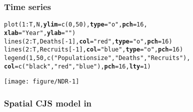 \documentclass[color=usenames,dvipsnames]{beamer}\usepackage[]{graphicx}\usepackage[]{color}
\makeatletter
\newcommand{\hlnum}[1]{\textcolor[rgb]{0.69,0.494,0}{#1}}%
\newcommand{\hlstr}[1]{\textcolor[rgb]{0.749,0.012,0.012}{#1}}%
\newcommand{\hlopt}[1]{\textcolor[rgb]{0,0,0}{#1}}%
\newcommand{\hlstd}[1]{\textcolor[rgb]{0,0,0}{#1}}%
\newcommand{\hlkwc}[1]{\textcolor[rgb]{0,0,0}{\textbf{#1}}}%
\newcommand{\hlkwd}[1]{\textcolor[rgb]{0.004,0.004,0.506}{#1}}%
\newenvironment{kframe}{%
 \def\at@end@of@kframe{}%
 \ifinner\ifhmode%
  \def\at@end@of@kframe{\end{minipage}}%
  \begin{minipage}{\columnwidth}%
 \fi\fi%
 \def\FrameCommand##1{\hskip\@totalleftmargin \hskip-\fboxsep
 \colorbox{shadecolor}{##1}\hskip-\fboxsep
     \hskip-\linewidth \hskip-\@totalleftmargin \hskip\columnwidth}%
 \MakeFramed {\advance\hsize-\width
   \@totalleftmargin\z@ \linewidth\hsize
   \@setminipage}}%
 {\par\unskip\endMakeFramed%
 \at@end@of@kframe}
\newenvironment{knitrout}{}{} %
\makeatother
\begin{document}
\begin{frame}[fragile]
  \frametitle{Time series}
\begin{knitrout}\tiny
{}\color{fgcolor}\begin{kframe}
\begin{alltt}
\hlkwd{plot}\hlstd{(}\hlnum{1}\hlopt{:}\hlstd{T, N,} \hlkwc{ylim}\hlstd{=}\hlkwd{c}\hlstd{(}\hlnum{0}\hlstd{,} \hlnum{50}\hlstd{),} \hlkwc{type}\hlstd{=}\hlstr{"o"}\hlstd{,} \hlkwc{pch}\hlstd{=}\hlnum{16}\hlstd{,}
     \hlkwc{xlab}\hlstd{=}\hlstr{"Year"}\hlstd{,} \hlkwc{ylab}\hlstd{=}\hlstr{""}\hlstd{)}
\hlkwd{lines}\hlstd{(}\hlnum{2}\hlopt{:}\hlstd{T, Deaths[}\hlopt{-}\hlnum{1}\hlstd{],} \hlkwc{col}\hlstd{=}\hlstr{"red"}\hlstd{,} \hlkwc{type}\hlstd{=}\hlstr{"o"}\hlstd{,} \hlkwc{pch}\hlstd{=}\hlnum{16}\hlstd{)}
\hlkwd{lines}\hlstd{(}\hlnum{2}\hlopt{:}\hlstd{T, Recruits[}\hlopt{-}\hlnum{1}\hlstd{],} \hlkwc{col}\hlstd{=}\hlstr{"blue"}\hlstd{,} \hlkwc{type}\hlstd{=}\hlstr{"o"}\hlstd{,} \hlkwc{pch}\hlstd{=}\hlnum{16}\hlstd{)}
\hlkwd{legend}\hlstd{(}\hlnum{1}\hlstd{,} \hlnum{50}\hlstd{,} \hlkwd{c}\hlstd{(}\hlstr{"Population size"}\hlstd{,} \hlstr{"Deaths"}\hlstd{,} \hlstr{"Recruits"}\hlstd{),}
       \hlkwc{col}\hlstd{=}\hlkwd{c}\hlstd{(}\hlstr{"black"}\hlstd{,} \hlstr{"red"}\hlstd{,} \hlstr{"blue"}\hlstd{),} \hlkwc{pch}\hlstd{=}\hlnum{16}\hlstd{,} \hlkwc{lty}\hlstd{=}\hlnum{1}\hlstd{)}
\end{alltt}
\end{kframe}

{\centering \texttt{[image: figure/NDR-1]} 

}



\end{knitrout}
\end{frame}



\begin{frame}[fragile]
  \frametitle{Spatial CJS model in \jags}
  \vspace{-5mm}
  \tiny \fbox{\parbox{\linewidth}{}}
\end{frame}
\end{document}

